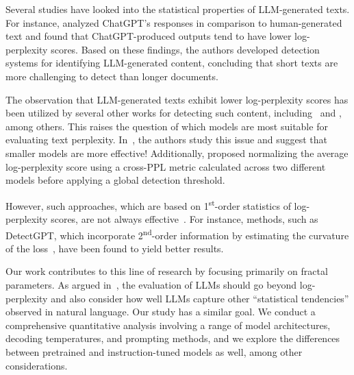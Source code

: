 Several studies have looked into the statistical properties of LLM-generated texts. For instance, \cite{guo2023closechatgpthumanexperts} analyzed ChatGPT's responses in comparison to human-generated text and found that ChatGPT-produced outputs tend to have lower log-perplexity scores. Based on these findings, the authors developed detection systems for identifying LLM-generated content, concluding that short texts are more challenging to detect than longer documents.

The observation that LLM-generated texts exhibit lower log-perplexity scores has been utilized by several other works for detecting such content, including~\cite{solaiman2019releasestrategiessocialimpacts,gehrmann-etal-2019-gltr,ippolito-etal-2020-automatic,vasilatos2023howkgptinvestigatingdetectionchatgptgenerated} and \cite{yang2023dnagptdivergentngramanalysis}, among others. This raises the question of which models are most suitable for evaluating text perplexity. In~\cite{mireshghallah-etal-2024-smaller}, the authors study this issue and suggest that smaller models are more effective! Additionally, \cite{hans2024spottingllmsbinocularszeroshot} proposed normalizing the average log-perplexity score using a cross-PPL metric calculated across two different models before applying a global detection threshold.

However, such approaches, which are based on 1\textsuperscript{st}-order statistics of log-perplexity scores, are not always effective~\citep{hans2024spottingllmsbinocularszeroshot}. For instance, methods, such as DetectGPT, which incorporate 2\textsuperscript{nd}-order information by estimating the curvature of the loss~\citep{10.5555/3618408.3619446}, have been found to yield better results.

Our work contributes to this line of research by focusing primarily on fractal parameters. As argued in~\citep{meister-cotterell-2021-language}, the evaluation of LLMs should go beyond log-perplexity and also consider how well LLMs capture other ``statistical tendencies'' observed in natural language. Our study has a similar goal. We conduct a comprehensive quantitative analysis involving a range of model architectures, decoding temperatures, and prompting methods, and we explore the differences between pretrained and instruction-tuned models as well, among other considerations.

